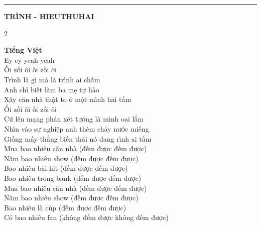 \vfill
\hrule
\vspace{0.25cm}

\begin{center}
\textbf{\LARGE TRÌNH - HIEUTHUHAI}
\end{center}

\begin{multicols*}{2}
\raggedright
\small

\textbf{Tiếng Việt} \\
\vspace{0.3em}
Ey ey yeah yeah \\
Ối zồi ôi ối zồi ôi \\
Trình là gì mà là trình ai chấm \\
Anh chỉ biết làm ba mẹ tự hào \\
Xây căn nhà thật to ở một mình hai tấm \\
Ối zồi ôi ối zồi ôi \\
Cứ lên mạng phán xét tưởng là mình oai lắm \\
Nhìn vào sự nghiệp anh thèm chảy nước miếng \\
Giống mấy thằng biến thái nó đang rình ai tắm \\
Mua bao nhiêu căn nhà (đếm được đếm được) \\
Năm bao nhiêu show (đếm được đếm được) \\
Bao nhiêu bài hit (đếm được đếm được) \\
Bao nhiêu trong bank (đếm được đếm được) \\
Mua bao nhiêu căn nhà (đếm được đếm được) \\
Năm bao nhiêu show (đếm được đếm được) \\
Bao nhiêu là cúp (đếm được đếm được) \\
Có bao nhiêu fan (không đếm được không đếm được)

\columnbreak


\end{multicols*}
